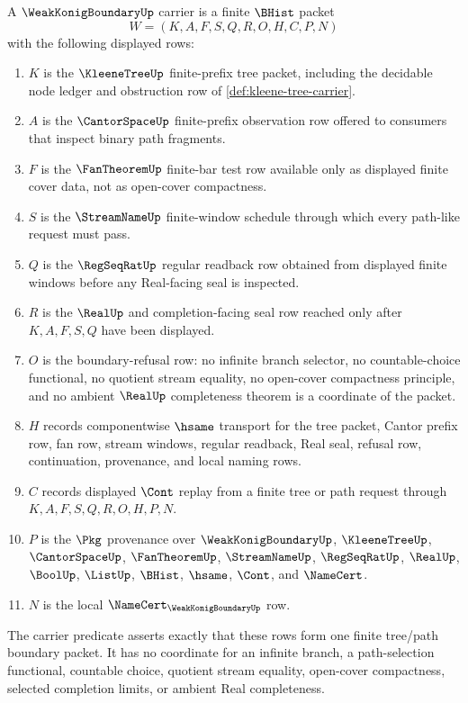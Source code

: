 \begin{definition}
\label{def:weak-konig-boundary-carrier}
A $\WeakKonigBoundaryUp$ carrier is a finite $\BHist$ packet
$$
W=(K,A,F,S,Q,R,O,H,C,P,N)
$$
with the following displayed rows:
\begin{enumerate}
\item $K$ is the $\KleeneTreeUp$ finite-prefix tree packet, including the decidable node ledger and obstruction row of \autoref{def:kleene-tree-carrier}.
\item $A$ is the $\CantorSpaceUp$ finite-prefix observation row offered to consumers that inspect binary path fragments.
\item $F$ is the $\FanTheoremUp$ finite-bar test row available only as displayed finite cover data, not as open-cover compactness.
\item $S$ is the $\StreamNameUp$ finite-window schedule through which every path-like request must pass.
\item $Q$ is the $\RegSeqRatUp$ regular readback row obtained from displayed finite windows before any Real-facing seal is inspected.
\item $R$ is the $\RealUp$ and completion-facing seal row reached only after $K,A,F,S,Q$ have been displayed.
\item $O$ is the boundary-refusal row: no infinite branch selector, no countable-choice functional, no quotient stream equality, no open-cover compactness principle, and no ambient $\RealUp$ completeness theorem is a coordinate of the packet.
\item $H$ records componentwise $\hsame$ transport for the tree packet, Cantor prefix row, fan row, stream windows, regular readback, Real seal, refusal row, continuation, provenance, and local naming rows.
\item $C$ records displayed $\Cont$ replay from a finite tree or path request through $K,A,F,S,Q,R,O,H,P,N$.
\item $P$ is the $\Pkg$ provenance over $\WeakKonigBoundaryUp$, $\KleeneTreeUp$, $\CantorSpaceUp$, $\FanTheoremUp$, $\StreamNameUp$, $\RegSeqRatUp$, $\RealUp$, $\BoolUp$, $\ListUp$, $\BHist$, $\hsame$, $\Cont$, and $\NameCert$.
\item $N$ is the local $\NameCert_{\WeakKonigBoundaryUp}$ row.
\end{enumerate}
The carrier predicate asserts exactly that these rows form one finite tree/path boundary packet. It has no coordinate for an infinite branch, a path-selection functional, countable choice, quotient stream equality, open-cover compactness, selected completion limits, or ambient Real completeness.
\end{definition}

